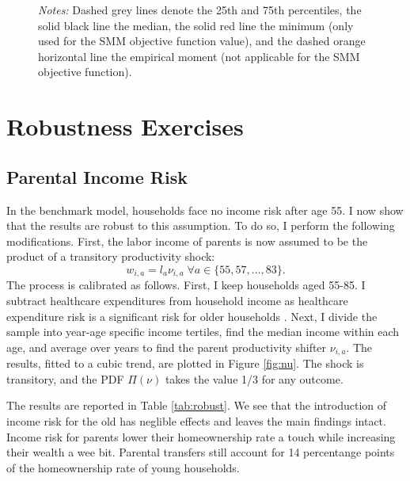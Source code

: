 \documentclass[12pt]{article}
\begin{document}
\begin{figure}
\begin{subfigure}{\textwidth}
	\end{subfigure}
	{\begin{footnotesize} \textit{Notes:} Dashed grey lines denote the 25th and 75th percentiles, the solid black line the median, the solid red line the minimum (only used for the SMM objective function value), and the dashed orange horizontal line the empirical moment (not applicable for the SMM objective function).\end{footnotesize}}
\end{figure}


\section{Robustness Exercises}
\subsection{Parental Income Risk}\label{sec:robust_incomerisk}
In the benchmark model, households face no income risk after age 55. I now show that the results are robust to this assumption. To do so, I perform the following modifications. First, the labor income of parents is now assumed to be the product of a transitory productivity shock:
\begin{equation*}
w_{i,a} = l_a \nu_{i,a} \; \forall a\in\{55,57,\dots,83\}. \label{eq:wp2}
\end{equation*}
The process is calibrated as follows. First, I keep households aged 55-85. I subtract healthcare expenditures from household income as healthcare expenditure risk is a significant risk for older households \citep{denardi2024}. Next, I divide the sample into year-age specific income tertiles, find the median income within each age, and average over years to find the parent productivity shifter $\nu_{i,a}$. The results, fitted to a cubic trend, are plotted in Figure \ref{fig:nu}. The shock is transitory, and the PDF $\Pi(\nu)$ takes the value 1/3 for any outcome.

The results are reported in Table \ref{tab:robust}. We see that the introduction of income risk for the old has neglible effects and leaves the main findings intact. Income risk for parents lower their homeownership rate a touch while increasing their wealth a wee bit. Parental transfers still account for 14 percentange points of the homeownership rate of young households.
\end{document}
